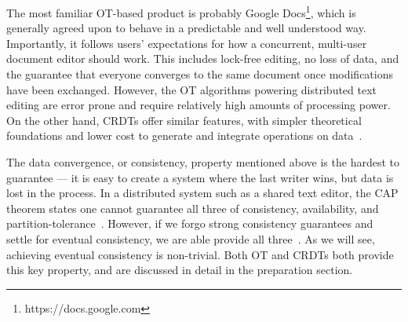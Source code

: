 \documentclass[12pt,a4paper,twoside,openright]{report}
\begin{document}
The most familiar OT-based product is probably Google Docs\footnote{https://docs.google.com}, which is generally agreed upon to behave in a predictable and well understood way. Importantly, it follows users' expectations for how a concurrent, multi-user document editor should work. This includes lock-free editing, no loss of data, and the guarantee that everyone converges to the same document once modifications have been exchanged. However, the OT algorithms powering distributed text editing are error prone and require relatively high amounts of processing power. On the other hand, CRDTs offer similar features, with simpler theoretical foundations and lower cost to generate and integrate operations on data~\cite{ahmed2011evaluating}.

The data convergence, or consistency, property mentioned above is the hardest to guarantee --- it is easy to create a system where the last writer wins, but data is lost in the process. In a distributed system such as a shared text editor, the CAP theorem states one cannot guarantee all three of consistency, availability, and partition-tolerance~\cite{Gilbert2005}. However, if we forgo strong consistency guarantees and settle for eventual consistency, we are able provide all three~\cite{zeller2014}. As we will see, achieving eventual consistency is non-trivial. Both OT and CRDTs both provide this key property, and are discussed in detail in the preparation section.


\end{document}
